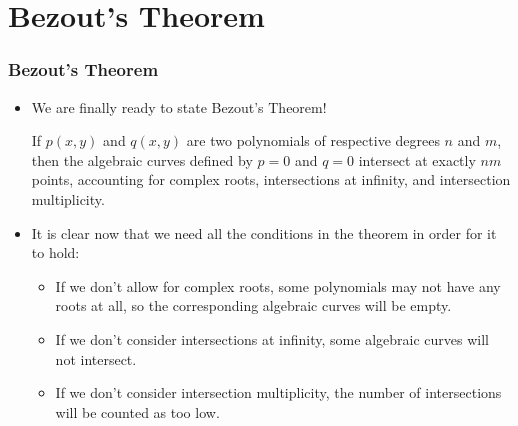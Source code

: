 \documentclass[handout]{beamer}
\begin{document}
\section{Bezout's Theorem}
\begin{frame}
	\frametitle{Bezout's Theorem}
	\begin{itemize}
		\item We are finally ready to state Bezout's Theorem!\pause
			\begin{theorem}
				If $p(x, y)$ and $q(x, y)$ are two polynomials of respective degrees $n$ and $m$, then the algebraic curves defined by $p = 0$ and $q = 0$ intersect at exactly $nm$ points, accounting for complex roots, intersections at infinity, and intersection multiplicity.
			\end{theorem}
		
		\item\pause It is clear now that we need all the conditions in the theorem in order for it to hold:
			\begin{itemize}
				\item\pause If we don't allow for complex roots, some polynomials may not have any roots at all, so the corresponding algebraic curves will be empty.
				
				\item\pause If we don't consider intersections at infinity, some algebraic curves will not intersect.
				
				\item\pause If we don't consider intersection multiplicity, the number of intersections will be counted as too low.
			\end{itemize}
	\end{itemize}
\end{frame}
\end{document}
